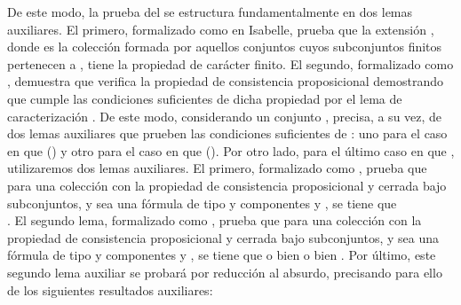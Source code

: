 \begin{isabellebody}
\begin{isamarkuptext}
  De este modo, la prueba del  se estructura fundamentalmente en dos lemas auxiliares. 
  El primero, formalizado como  en Isabelle, prueba que la extensión 
  , donde  es la colección formada por aquellos conjuntos cuyos subconjuntos finitos 
  pertenecen a , tiene la propiedad de carácter finito. El segundo, formalizado como , 
  demuestra que  verifica la propiedad de consistencia proposicional demostrando que cumple las 
  condiciones suficientes de dicha propiedad por el lema de caracterización . De este modo, 
  considerando un conjunto ,  precisa, a su vez, de dos lemas auxiliares que 
  prueben las condiciones suficientes de : uno para el caso en que  () y 
  otro para el caso en que  (). Por otro lado, para el último caso en que 
  , utilizaremos dos lemas auxiliares. El primero, formalizado como , 
  prueba que para  una colección con la propiedad de consistencia proposicional y cerrada bajo 
  subconjuntos,  y sea  una fórmula de tipo \isa{{\isasymalpha}} y componentes  y , se tiene que\\ 
  . El segundo lema, formalizado como , prueba que para  una 
  colección con la propiedad de consistencia proposicional y cerrada bajo subconjuntos,  y 
  sea  una fórmula de tipo \isa{{\isasymbeta}} y componentes  y , se tiene que o bien  o 
  bien . Por último, este segundo lema auxiliar se probará por reducción al absurdo, 
  precisando para ello de los siguientes resultados auxiliares:
  

\end{isamarkuptext}
\end{isabellebody}
